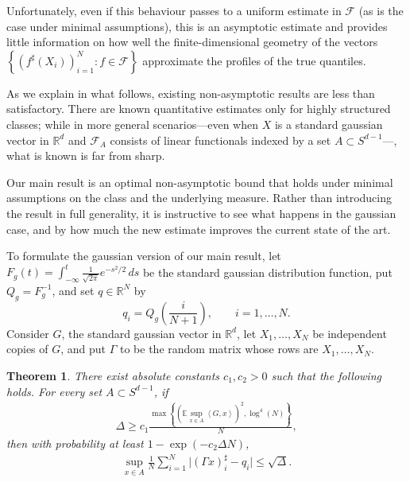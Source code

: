 \documentclass[11pt]{amsart}
\newcommand{\R}{\mathbb{R}}
\newcommand{\inr}[1]{\left\langle #1 \right\rangle}
\newtheorem{theorem}{Theorem}[section]
\theoremstyle{definition}
\newcommand{\E}{\mathbb{E}}
\numberwithin{equation}{section}
\begin{document}
\vskip0.3cm
Unfortunately, even if this behaviour passes to a uniform estimate in $\mathcal{F}$ (as is the case under minimal assumptions), this is an asymptotic estimate and provides little information on how well the finite-dimensional geometry of the vectors $\left\{(f^\sharp(X_i))_{i=1}^N :  f \in \mathcal{F}\right\}$ approximate the profiles of the true quantiles. 

As we explain in what follows, existing non-asymptotic results are less than satisfactory. There are known quantitative estimates only for highly structured classes; while in more general scenarios---even when $X$ is a standard gaussian vector in $\R^d$ and $\mathcal{F}_A$ consists of linear functionals indexed by a set $A\subset S^{d-1}$---, what is known is far from sharp.

Our main result is an optimal non-asymptotic bound that holds under minimal assumptions on the class and the underlying measure. Rather than introducing the result in full generality, it is instructive to see what happens in the gaussian case, and by how much the new estimate improves the current state of the art. 

To formulate the gaussian version of our main result, let $F_g(t)=\int_{-\infty}^t \frac{1}{\sqrt{2\pi}} e^{-s^2/2}\,ds$ be the standard gaussian distribution function, put $Q_g=F_{g}^{-1}$, and set $q\in\R^N$ by
\[
q_i = Q_g\!\left(\frac{i}{N+1}\right), \qquad i=1,\ldots,N.
\]
Consider $G$, the standard gaussian vector in $\R^d$, let $X_1,\ldots,X_N$ be independent copies of $G$, and put $\Gamma$ to be the random matrix whose rows are $X_1,\ldots,X_N$.

\begin{tcolorbox}
\begin{theorem}
\label{thm:main.intro}
There exist absolute constants $c_1,c_2>0$ such that the following holds. For every set $A\subset S^{d-1}$, if
\begin{align}
\label{eq:rest.Delta}
\Delta \ge c_1 \frac{\max\left\{ (  \E \sup_{x\in A} \inr{G,x} )^2, \log^4 (N) \right\}}{N},
\end{align}
then with probability at least $1-\exp(-c_2\Delta N)$,
\begin{align}
\label{eq:structure.Gamma.via.L1}
\sup_{x\in A} \frac{1}{N}\sum_{i=1}^N \big|(\Gamma x)^\sharp_i - q_i\big|
\le \sqrt{\Delta}.
\end{align}
\end{theorem}
\end{tcolorbox}
\end{document}
